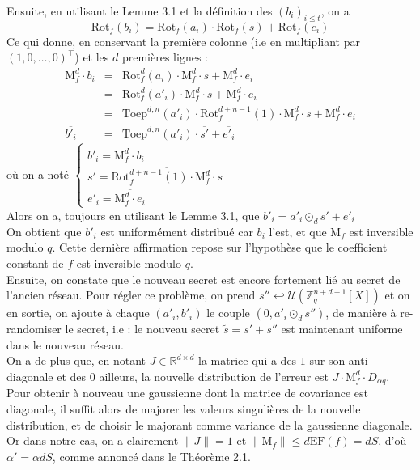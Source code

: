 \documentclass[11pt,a4paper]{article}
\begin{document}
Ensuite, en utilisant le Lemme 3.1 et la définition des $(b_i)_{i\leq t}$, on a 
\[\text{Rot}_f(b_i)=\text{Rot}_f(a_i)\cdot\text{Rot}_f(s)+\text{Rot}_f(e_i)\]
Ce qui donne, en conservant la première colonne (i.e en multipliant par $(1,0,\dots,0)^\top$) et les $d$ premières lignes :
\begin{eqnarray*}
\text{M}_f^d\cdot b_i &=& \text{Rot}_f^d(a_i)\cdot\text{M}_f^d\cdot s +\text{M}_f^d\cdot e_i \\
&=& \text{Rot}_f^d(a'_i)\cdot\text{M}_f^d\cdot s +\text{M}_f^d\cdot e_i  \\
&=& \text{Toep}^{d,n}(a'_i)\cdot\text{Rot}^{d+n-1}_f(1)\cdot\text{M}_f^d\cdot s +\text{M}_f^d\cdot e_i  \\
\overline{b'_i}&=& \text{Toep}^{d,n}(a'_i)\cdot\overline{s'} + \overline{e'_i}
\end{eqnarray*}
où on a noté $\begin{cases} b'_i = \overline{\text{M}_f^d\cdot b_i} \\ s' = \overline{\text{Rot}^{d+n-1}_f(1)\cdot\text{M}_f^d\cdot s} \\ e'_i = \overline{\text{M}_f^d\cdot e_i} \end{cases}$ \\

Alors on a, toujours en utilisant le Lemme 3.1, que $b'_i = a'_i \odot_d s' + e'_i$ \\

On obtient que $b'_i$ est uniformément distribué car $b_i$ l'est, et que $\text{M}_f$ est inversible modulo $q$. Cette dernière affirmation repose sur l'hypothèse que le coefficient constant de $f$ est inversible modulo $q$. \\

Ensuite, on constate que le nouveau secret est encore fortement lié au secret de l'ancien réseau. Pour régler ce problème, on prend $s'' \hookleftarrow \mathcal{U}(\mathbb{Z}_q^{n+d-1}[X])$ et on en sortie, on ajoute à chaque $(a'_i,b'_i)$ le couple $(0,a'_i\odot_d s'')$, de manière à re-randomiser le secret, i.e : le nouveau secret $\tilde s = s'+s''$ est maintenant uniforme dans le nouveau réseau.  \\

On a de plus que, en notant $J \in \mathbb{R}^{d\times d}$ la matrice qui a des $1$ sur son anti-diagonale et des $0$ ailleurs, la nouvelle distribution de l'erreur est $J\cdot\text{M}_f^d\cdot D_{\alpha q}$. Pour obtenir à nouveau une gaussienne dont la matrice de covariance est diagonale, il suffit alors de majorer les valeurs singulières de la nouvelle distribution, et de choisir le majorant comme variance de la gaussienne diagonale. Or dans notre cas, on a clairement $\|J\|=1$ et $\|\text{M}_f\| \leq d\text{EF}(f)=dS$, d'où $\alpha'=\alpha d S$, comme annoncé dans le Théorème 2.1. \\
\end{document}
